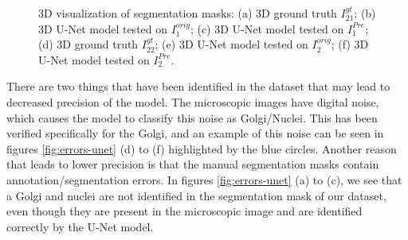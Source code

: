 \begin{figure}[!htb]
\hfil 
{}\hfil
{}
\caption{3D visualization of segmentation masks: (a) 3D ground truth $I^{gt}_{21}$; (b) 3D U-Net model tested on $I^{orig}_1$; (c) 3D U-Net model tested on $I^{Pre}_1$; (d) 3D ground truth $I^{gt}_{22}$; (e) 3D U-Net model tested on $I^{orig}_2$; (f) 3D U-Net model tested on $I^{Pre}_2$.}

\label{fig:results-unet}

\end{figure}

There are two things that have been identified in the dataset that may lead to decreased precision of the model. The microscopic images have digital noise, which causes the model to classify this noise as Golgi/Nuclei. This has been verified specifically for the Golgi, and an example of this noise can be seen in figures \ref{fig:errors-unet} (d) to (f) highlighted by the blue circles. Another reason that leads to lower precision is that the manual segmentation masks contain annotation/segmentation errors. In figures \ref{fig:errors-unet} (a) to (c), we see that a Golgi and nuclei are not identified in the segmentation mask  of our dataset, even though they are present in the microscopic image and are identified correctly by the U-Net model.

